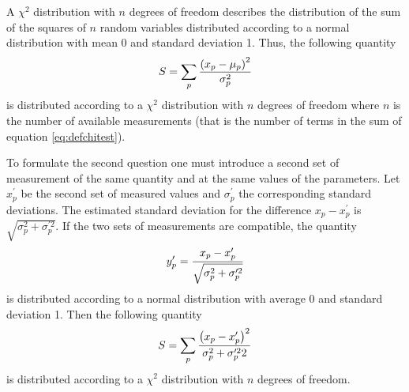 \documentclass[twoside]{book}
\begin{document}
A $\chi^2$ distribution with $n$ degrees of freedom describes the
distribution of the sum of the squares of $n$ random variables
distributed according to a normal distribution with mean 0 and
standard deviation 1. Thus, the following quantity
\begin{equation}
\label{eq:defchitest}
  S=\sum_p { \left(x_p - \mu_p\right)^2\over \sigma_p^2}
\end{equation}
is distributed according to a $\chi^2$ distribution with $n$
degrees of freedom where $n$ is the number of available
measurements (that is the number of terms in the sum of equation
\ref{eq:defchitest}).

To formulate the second question one must introduce a second set
of measurement of the same quantity and at the same values of the
parameters. Let $x^{\prime}_p$ be the second set of measured
values and $\sigma^{\prime}_p$ the corresponding standard
deviations. The estimated standard deviation for the difference
$x_p - x^{\prime}_p$ is $\sqrt{\sigma_p^2+\sigma^{\prime 2}_p }$.
If the two sets of measurements are compatible, the quantity
\begin{equation}
  y^{\prime}_p = { x_p - x^{\prime}_p \over
  \sqrt{\sigma_p^2+\sigma^{\prime 2}_p}}
\end{equation}
is distributed according to a normal distribution with average 0
and standard deviation 1. Then the following quantity
\begin{equation}
\label{eq:defchitestcmp}
  S=\sum_p { \left(x_p - x^{\prime}_p\right)^2\over \sigma_p^2+\sigma^{\prime 2}_p2}
\end{equation}
is distributed according to a $\chi^2$ distribution with $n$
degrees of freedom.
\end{document}
